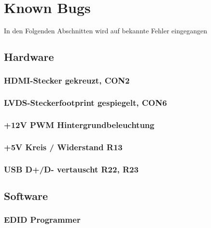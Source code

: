 \section{Known Bugs}
In den Folgenden Abschnitten wird auf bekannte Fehler eingegangen 
\subsection{Hardware}
\subsubsection{HDMI-Stecker gekreuzt, CON2}
\subsubsection{LVDS-Steckerfootprint gespiegelt, CON6}
\subsubsection{+12V PWM Hintergrundbeleuchtung}
\subsubsection{+5V Kreis / Widerstand R13}
\subsubsection{USB D+/D- vertauscht R22, R23}
\subsection{Software}
\subsubsection{EDID Programmer}
